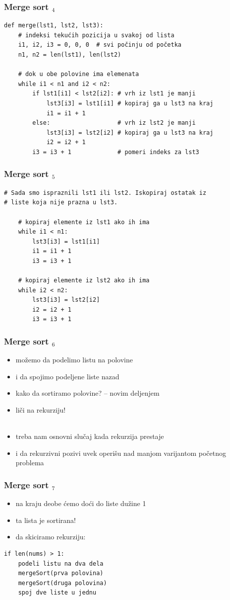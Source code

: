 \documentclass[utf8,compress]{beamer}
\begin{document}
\begin{frame}[fragile]
  \frametitle{Merge sort $_4$}
\begin{verbatim}
def merge(lst1, lst2, lst3):
    # indeksi tekućih pozicija u svakoj od lista
    i1, i2, i3 = 0, 0, 0  # svi počinju od početka
    n1, n2 = len(lst1), len(lst2)

    # dok u obe polovine ima elemenata
    while i1 < n1 and i2 < n2:
        if lst1[i1] < lst2[i2]: # vrh iz lst1 je manji
            lst3[i3] = lst1[i1] # kopiraj ga u lst3 na kraj
            i1 = i1 + 1
        else:                   # vrh iz lst2 je manji
            lst3[i3] = lst2[i2] # kopiraj ga u lst3 na kraj
            i2 = i2 + 1
        i3 = i3 + 1             # pomeri indeks za lst3
\end{verbatim}
\end{frame}

\begin{frame}[fragile]
  \frametitle{Merge sort $_5$}
\begin{verbatim}
# Sada smo ispraznili lst1 ili lst2. Iskopiraj ostatak iz
# liste koja nije prazna u lst3.

    # kopiraj elemente iz lst1 ako ih ima
    while i1 < n1:
        lst3[i3] = lst1[i1]
        i1 = i1 + 1
        i3 = i3 + 1

    # kopiraj elemente iz lst2 ako ih ima
    while i2 < n2:
        lst3[i3] = lst2[i2]
        i2 = i2 + 1
        i3 = i3 + 1
\end{verbatim}
\end{frame}

\begin{frame}[fragile]
  \frametitle{Merge sort $_6$}
  \begin{itemize}
    \item možemo da podelimo listu na polovine
    \item i da spojimo podeljene liste nazad
    \item kako da sortiramo polovine? -- novim deljenjem
    \item liči na rekurziju! \\ \ \\
    \item treba nam osnovni slučaj kada rekurzija prestaje
    \item i da rekurzivni pozivi uvek operišu nad manjom varijantom početnog problema
  \end{itemize}
\end{frame}

\begin{frame}[fragile]
  \frametitle{Merge sort $_7$}
  \begin{itemize}
    \item na kraju deobe ćemo doći do liste dužine 1
    \item ta lista je sortirana!
    \item da skiciramo rekurziju:
  \end{itemize}
\begin{verbatim}
if len(nums) > 1:
    podeli listu na dva dela
    mergeSort(prva polovina)
    mergeSort(druga polovina)
    spoj dve liste u jednu
\end{verbatim}
\end{frame}
\end{document}
